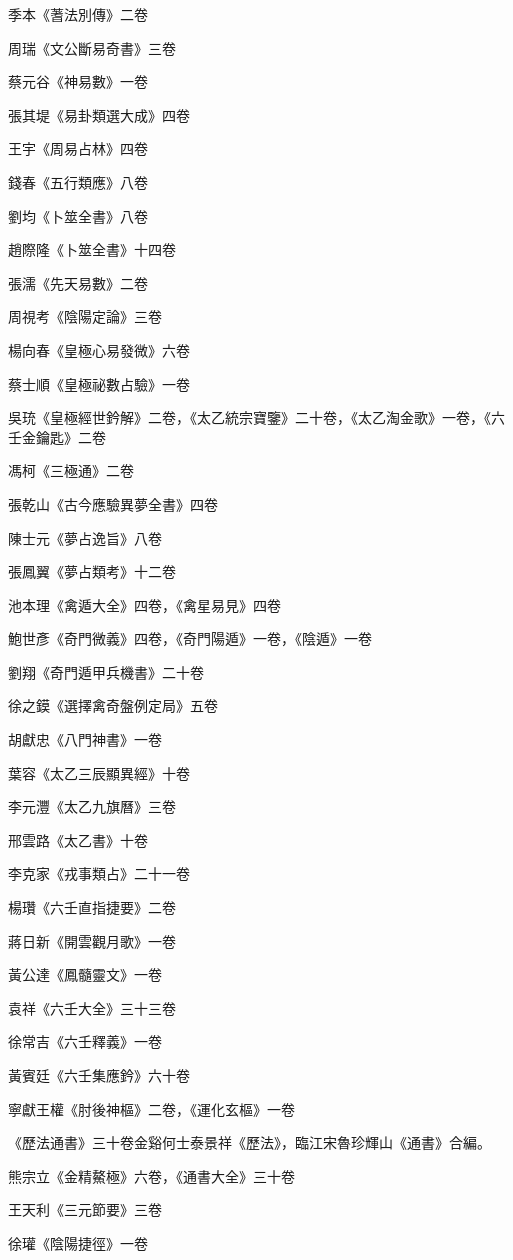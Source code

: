 季本《蓍法別傳》二卷

周瑞《文公斷易奇書》三卷

蔡元谷《神易數》一卷

張其堤《易卦類選大成》四卷

王宇《周易占林》四卷

錢春《五行類應》八卷

劉均《卜筮全書》八卷

趙際隆《卜筮全書》十四卷

張濡《先天易數》二卷

周視考《陰陽定論》三卷

楊向春《皇極心易發微》六卷

蔡士順《皇極祕數占驗》一卷

吳珫《皇極經世鈐解》二卷，《太乙統宗寶鑒》二十卷，《太乙淘金歌》一卷，《六壬金鑰匙》二卷

馮柯《三極通》二卷

張乾山《古今應驗異夢全書》四卷

陳士元《夢占逸旨》八卷

張鳳翼《夢占類考》十二卷

池本理《禽遁大全》四卷，《禽星易見》四卷

鮑世彥《奇門微義》四卷，《奇門陽遁》一卷，《陰遁》一卷

劉翔《奇門遁甲兵機書》二十卷

徐之鏌《選擇禽奇盤例定局》五卷

胡獻忠《八門神書》一卷

葉容《太乙三辰顯異經》十卷

李元灃《太乙九旗曆》三卷

邢雲路《太乙書》十卷

李克家《戎事類占》二十一卷

楊瓚《六壬直指捷要》二卷

蔣日新《開雲觀月歌》一卷

黃公達《鳳髓靈文》一卷

袁祥《六壬大全》三十三卷

徐常吉《六壬釋義》一卷

黃賓廷《六壬集應鈐》六十卷

寧獻王權《肘後神樞》二卷，《運化玄樞》一卷

《歷法通書》三十卷金谿何士泰景祥《歷法》，臨江宋魯珍輝山《通書》合編。

熊宗立《金精鰲極》六卷，《通書大全》三十卷

王天利《三元節要》三卷

徐瓘《陰陽捷徑》一卷

